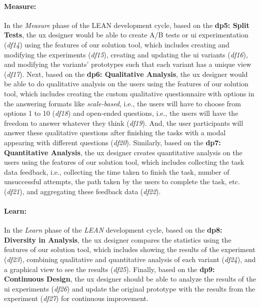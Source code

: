 \paragraph{Measure:}
In the \textit{Measure} phase of the LEAN development cycle, based on the \textbf{\ac{dp}5: Split Tests}, the \ac{ux} designer would be able to create A/B tests or \ac{ui} experimentation (\textit{\ac{df}14}) using the features of our solution tool, which includes creating and modifying the experiments (\textit{\ac{df}15}), creating and updating the \ac{ui} variants (\textit{\ac{df}16}), and modifying the variants' prototypes such that each variant has a unique view (\textit{\ac{df}17}).
Next, based on the \textbf{\ac{dp}6: Qualitative Analysis}, the \ac{ux} designer would be able to do qualitative analysis on the users using the features of our solution tool, which includes creating the custom qualitative questionnaire with options in the answering formats like \textit{scale-based}, i.e., the users will have to choose from options 1 to 10 (\textit{\ac{df}18}) and open-ended questions, i.e., the users will have the freedom to answer whatever they think (\textit{\ac{df}19}). 
And, the user participants will answer these qualitative questions after finishing the tasks with a modal appearing with different questions (\textit{\ac{df}20}). 
Similarly, based on the \textbf{\ac{dp}7: Quantitative Analysis}, the \ac{ux} designer creates quantitative analysis on the users using the features of our solution tool, which includes collecting the task data feedback, i.e., collecting the time taken to finish the task, number of unsuccessful attempts, the path taken by the users to complete the task, etc. (\textit{\ac{df}21}), and aggregating these feedback data (\textit{\ac{df}22}). 

\paragraph{Learn:}
In the \textit{Learn} phase of the \textit{LEAN} development cycle, based on the \textbf{\ac{dp}8: Diversity in Analysis}, the \ac{ux} designer compares the statistics using the features of our solution tool, which includes showing the results of the experiment (\textit{\ac{df}23}), combining qualitative and quantitative analysis of each variant (\textit{\ac{df}24}), and a graphical view to see the results (\textit{\ac{df}25}). 
Finally, based on the \textbf{\ac{dp}9: Continuous Design}, the \ac{ux} designer should be able to analyze the results of the \ac{ui} experiments (\textit{\ac{df}26}) and update the original prototype with the results from the experiment (\textit{\ac{df}27}) for continuous improvement.

